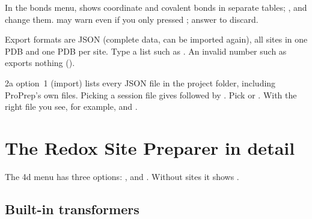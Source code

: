 \medskip
In the bonds menu,  shows coordinate and covalent bonds in
separate tables; ,  and  change
them.  may warn  even if you
only pressed ; answer  to discard.

Export formats are  JSON (complete data, can be imported again),
 all sites in one PDB and  one PDB per site. Type a list such
as . An invalid number such as  exports nothing
().

\begin{watchout}
2a option~1 (import) lists every JSON file in the project folder, including
ProPrep's own  files. Picking a session file
gives  followed by
. Pick  or
. With the right file you see, for example,
 and
.
\end{watchout}

\section{The Redox Site Preparer in detail}
\label{sec:redox-preparer}

The 4d menu has three options:  ,  
and  .
Without sites it shows .

\subsection{Built-in transformers}

